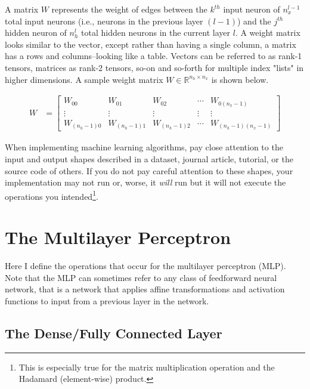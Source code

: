 \documentclass{article}
\begin{document}
A matrix $W$ represents the weight of edges between the $k^{th}$
input neuron of $n_x^{l-1}$ total input neurons (i.e., neurons in the previous layer $(l-1)$)
and the $j^{th}$ hidden neuron of $n_h^{l}$ total hidden neurons in the current layer $l$.
A weight matrix looks similar to the vector, except rather than having a single
column, a matrix has a rows and columns--looking like a table. Vectors can
be referred to as rank-1 tensors, matrices as rank-2 tensors, so-on and so-forth
for multiple index "lists" in higher dimensions. A sample weight matrix
$W \in \mathbb{R}^{n_h \times n_x}$ is shown below.

\begin{align}
	W & = \begin{bmatrix}
		W_{00}         & W_{01}         & W_{02}         & \cdots & W_{0(n_{x}-1)}         \\
		\vdots         & \vdots         & \vdots         & \vdots & \vdots                 \\
		W_{(n_{h}-1)0} & W_{(n_{h}-1)1} & W_{(n_{h}-1)2} & \cdots & W_{(n_{h}-1)(n_{x}-1)}
	\end{bmatrix}
\end{align}

When implementing machine learning algorithms, pay close attention to the
input and output shapes described in a dataset, journal article, tutorial, or
the source code of others. If you do not pay careful attention to these shapes,
your implementation may not run or, worse, it \textit{will} run but it will not execute
the operations you intended\footnote{This is especially true for the
	matrix multiplication operation and the Hadamard (element-wise) product.}.

\section{The Multilayer Perceptron}

\quad Here I define the operations that occur for the multilayer perceptron (MLP).
Note that the MLP can sometimes refer to any class of feedforward
neural network, that is a network that applies affine transformations and
activation functions to input from a previous layer in the network.

\subsection{The Dense/Fully Connected Layer}
\end{document}
